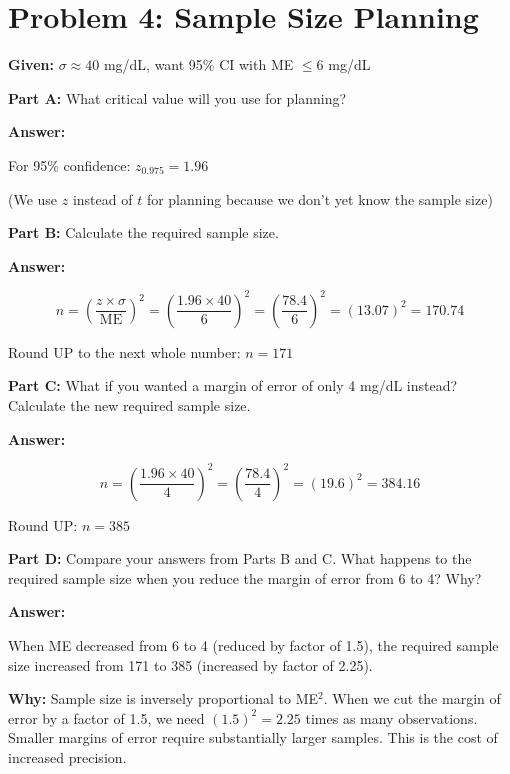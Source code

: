 \documentclass[11pt]{article}
\begin{document}
\newpage

\section{Problem 4: Sample Size Planning}

\textbf{Given:} $\sigma \approx 40$ mg/dL, want 95\% CI with ME $\leq 6$ mg/dL

\vspace{6pt}

\textbf{Part A:} What critical value will you use for planning?

\textcolor{answergreen}{\textbf{Answer:}}

For 95\% confidence: $z_{0.975} = 1.96$

(We use $z$ instead of $t$ for planning because we don't yet know the sample size)

\vspace{6pt}

\textbf{Part B:} Calculate the required sample size.

\textcolor{answergreen}{\textbf{Answer:}}

$$n = \left(\frac{z \times \sigma}{\text{ME}}\right)^2 = \left(\frac{1.96 \times 40}{6}\right)^2 = \left(\frac{78.4}{6}\right)^2 = (13.07)^2 = 170.74$$

Round UP to the next whole number: $n = 171$

\vspace{6pt}

\textbf{Part C:} What if you wanted a margin of error of only 4 mg/dL instead? Calculate the new required sample size.

\textcolor{answergreen}{\textbf{Answer:}}

$$n = \left(\frac{1.96 \times 40}{4}\right)^2 = \left(\frac{78.4}{4}\right)^2 = (19.6)^2 = 384.16$$

Round UP: $n = 385$

\vspace{6pt}

\textbf{Part D:} Compare your answers from Parts B and C. What happens to the required sample size when you reduce the margin of error from 6 to 4? Why?

\textcolor{answergreen}{\textbf{Answer:}}

When ME decreased from 6 to 4 (reduced by factor of 1.5), the required sample size increased from 171 to 385 (increased by factor of 2.25).

\textbf{Why:} Sample size is inversely proportional to ME$^2$. When we cut the margin of error by a factor of 1.5, we need $(1.5)^2 = 2.25$ times as many observations. Smaller margins of error require substantially larger samples. This is the cost of increased precision.
\end{document}
